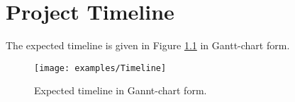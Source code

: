 \chapter{Project Timeline}

The expected timeline is given in Figure \ref{Ganttchart} in Gantt-chart form.


\begin{figure}[htb]
\centering
\texttt{[image: examples/Timeline]}
\caption{Expected timeline in Gannt-chart form.}
\label{Ganttchart}
\end{figure}